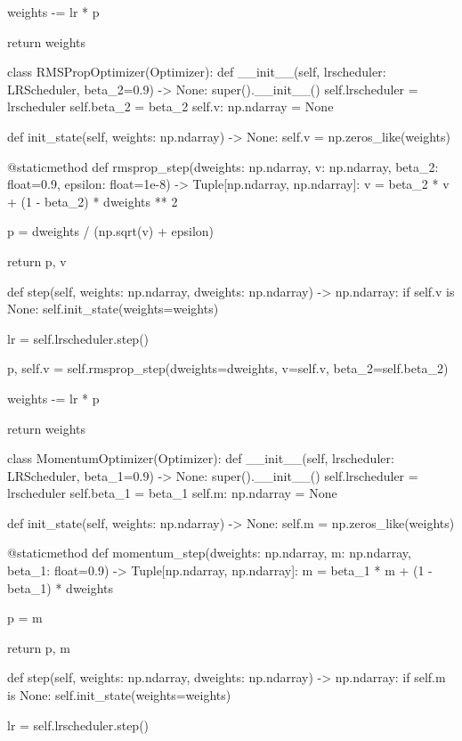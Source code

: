 \documentclass[14pt, a4paper]{article}
\theoremstyle{sltheorem}
\theoremstyle{soltheorem}
\begin{document}
\begin{python}
        weights -= lr * p
        
        return weights
    
    
class RMSPropOptimizer(Optimizer):
    def __init__(self, lrscheduler: LRScheduler, beta_2=0.9) -> None:
        super().__init__()
        self.lrscheduler = lrscheduler
        self.beta_2 = beta_2
        self.v: np.ndarray = None
        
    
    def init_state(self, weights: np.ndarray) -> None:
        self.v = np.zeros_like(weights)
    
    @staticmethod
    def rmsprop_step(dweights: np.ndarray, v: np.ndarray, beta_2: float=0.9, epsilon: float=1e-8) -> Tuple[np.ndarray, np.ndarray]:
        v = beta_2 * v + (1 - beta_2) * dweights ** 2

        p = dweights / (np.sqrt(v) + epsilon)

        return p, v
    
    
    def step(self, weights: np.ndarray, dweights: np.ndarray) -> np.ndarray:
        if self.v is None:
            self.init_state(weights=weights)
        
        lr = self.lrscheduler.step()
        
        p, self.v = self.rmsprop_step(dweights=dweights, v=self.v, beta_2=self.beta_2)
        
        weights -= lr * p
        
        return weights
    
    
class MomentumOptimizer(Optimizer):
    def __init__(self, lrscheduler: LRScheduler, beta_1=0.9) -> None:
        super().__init__()
        self.lrscheduler = lrscheduler
        self.beta_1 = beta_1
        self.m: np.ndarray = None
        
    
    def init_state(self, weights: np.ndarray) -> None:
        self.m = np.zeros_like(weights)
        
        
    @staticmethod
    def momentum_step(dweights: np.ndarray, m: np.ndarray, beta_1: float=0.9) -> Tuple[np.ndarray, np.ndarray]:
        m = beta_1 * m + (1 - beta_1) * dweights

        p = m

        return p, m
    
    def step(self, weights: np.ndarray, dweights: np.ndarray) -> np.ndarray:
        if self.m is None:
            self.init_state(weights=weights)
        
        lr = self.lrscheduler.step()
        

\end{python}
\end{document}
